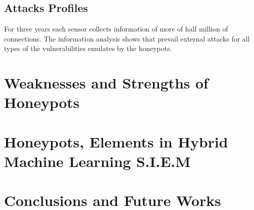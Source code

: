 \documentclass[a4paper]{llncs}
\begin{document}
\subsection{Attacks Profiles}

For three years each sensor collects information of more of half million of connections. The information analysis shows that prevail external attacks for all types of the vulnerabilities emulates by the honeypots.


\section{Weaknesses and Strengths of Honeypots}

\section{Honeypots, Elements in Hybrid Machine Learning S.I.E.M}

\section{Conclusions and Future Works}
\end{document}
